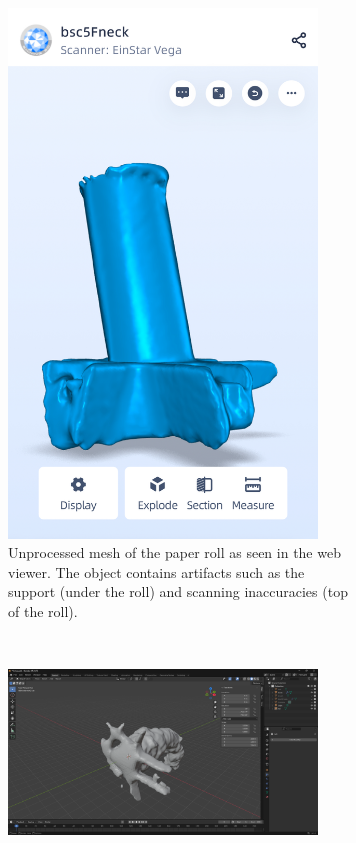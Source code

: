 \documentclass[12pt,a4paper]{article}
\begin{document}
\begin{figure}[h]
  \centering
  \begin{subfigure}[t]{0.3\linewidth}
    \centering
    \includegraphics[width=0.9\textwidth]{media/scanned_roll.PNG}
    \caption{Unprocessed mesh of the paper roll as seen in the web viewer. The
      object contains artifacts such as the support (under the roll)
      and scanning
    inaccuracies (top of the roll).}
  \end{subfigure}
  ~
  \begin{subfigure}[t]{0.4\linewidth}
    \centering
    \includegraphics[width=0.9\textwidth]{media/blender_import.png}

\end{subfigure}
\end{figure}
\end{document}
